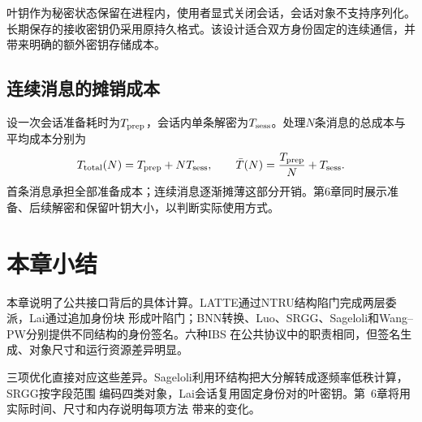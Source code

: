 叶钥作为秘密状态保留在进程内，使用者显式关闭会话，会话对象不支持序列化。长期保存的接收密钥仍采用原持久格式。该设计适合双方身份固定的连续通信，并带来明确的额外密钥存储成本。

\subsection{连续消息的摊销成本}
设一次会话准备耗时为$T_{\rm prep}$，会话内单条解密为$T_{\rm sess}$。处理$N$条消息的总成本与平均成本分别为
\[
 T_{\rm total}(N)=T_{\rm prep}+NT_{\rm sess},\qquad
 \bar T(N)=\frac{T_{\rm prep}}{N}+T_{\rm sess}.
\]
首条消息承担全部准备成本；连续消息逐渐摊薄这部分开销。第6章同时展示准备、后续解密和保留叶钥大小，以判断实际使用方式。

\section{本章小结}

本章说明了公共接口背后的具体计算。LATTE通过NTRU结构陷门完成两层委派，Lai通过追加身份块
形成叶陷门；BNN转换、Luo、SRGG、Sageloli和Wang--PW分别提供不同结构的身份签名。六种IBS
在公共协议中的职责相同，但签名生成、对象尺寸和运行资源差异明显。

三项优化直接对应这些差异。Sageloli利用环结构把大分解转成逐频率低秩计算，SRGG按字段范围
编码四类对象，Lai会话复用固定身份对的叶密钥。第~6章将用实际时间、尺寸和内存说明每项方法
带来的变化。
